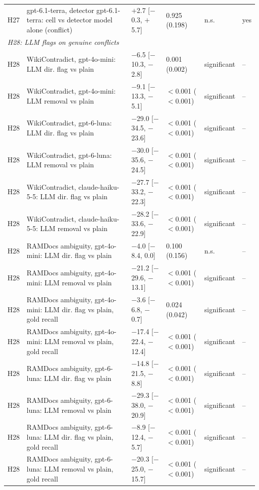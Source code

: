 \begin{table}[p]
{\begin{tabular}{lp{6.6cm}llll}
H27 & gpt-6.1-terra, detector gpt-6.1-terra: cell vs detector model alone (conflict) & $+$2.7 [$-$0.3, $+$5.7] & 0.925 (0.198) & n.s. & yes \\
\multicolumn{6}{l}{\emph{H28: LLM flags on genuine conflicts}} \\
H28 & WikiContradict, gpt-4o-mini: LLM dir. flag vs plain & $-$6.5 [$-$10.3, $-$2.8] & 0.001 (0.002) & significant & -- \\
H28 & WikiContradict, gpt-4o-mini: LLM removal vs plain & $-$9.1 [$-$13.3, $-$5.1] & $<$0.001 ($<$0.001) & significant & -- \\
H28 & WikiContradict, gpt-6-luna: LLM dir. flag vs plain & $-$29.0 [$-$34.5, $-$23.6] & $<$0.001 ($<$0.001) & significant & -- \\
H28 & WikiContradict, gpt-6-luna: LLM removal vs plain & $-$30.0 [$-$35.6, $-$24.5] & $<$0.001 ($<$0.001) & significant & -- \\
H28 & WikiContradict, claude-haiku-5-5: LLM dir. flag vs plain & $-$27.7 [$-$33.2, $-$22.3] & $<$0.001 ($<$0.001) & significant & -- \\
H28 & WikiContradict, claude-haiku-5-5: LLM removal vs plain & $-$28.2 [$-$33.6, $-$22.9] & $<$0.001 ($<$0.001) & significant & -- \\
H28 & RAMDocs ambiguity, gpt-4o-mini: LLM dir. flag vs plain & $-$4.0 [$-$8.4, 0.0] & 0.100 (0.156) & n.s. & -- \\
H28 & RAMDocs ambiguity, gpt-4o-mini: LLM removal vs plain & $-$21.2 [$-$29.6, $-$13.1] & $<$0.001 ($<$0.001) & significant & -- \\
H28 & RAMDocs ambiguity, gpt-4o-mini: LLM dir. flag vs plain, gold recall & $-$3.6 [$-$6.8, $-$0.7] & 0.024 (0.042) & significant & -- \\
H28 & RAMDocs ambiguity, gpt-4o-mini: LLM removal vs plain, gold recall & $-$17.4 [$-$22.4, $-$12.4] & $<$0.001 ($<$0.001) & significant & -- \\
H28 & RAMDocs ambiguity, gpt-6-luna: LLM dir. flag vs plain & $-$14.8 [$-$21.5, $-$8.8] & $<$0.001 ($<$0.001) & significant & -- \\
H28 & RAMDocs ambiguity, gpt-6-luna: LLM removal vs plain & $-$29.3 [$-$38.0, $-$20.9] & $<$0.001 ($<$0.001) & significant & -- \\
H28 & RAMDocs ambiguity, gpt-6-luna: LLM dir. flag vs plain, gold recall & $-$8.9 [$-$12.4, $-$5.7] & $<$0.001 ($<$0.001) & significant & -- \\
H28 & RAMDocs ambiguity, gpt-6-luna: LLM removal vs plain, gold recall & $-$20.3 [$-$25.0, $-$15.7] & $<$0.001 ($<$0.001) & significant & -- \\

\end{tabular}}
\end{table}
